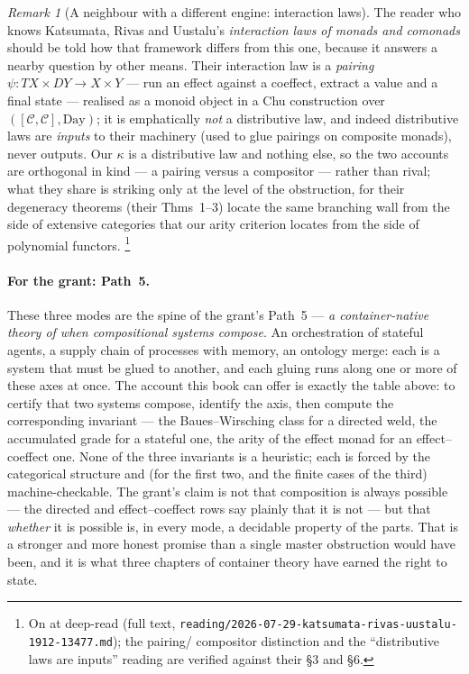 \documentclass[11pt,a4paper]{book}
\theoremstyle{plain}
\theoremstyle{definition}
\theoremstyle{remark}
\newtheorem{Remark}[Theorem]{Remark}
\begin{document}
\begin{Remark}[A neighbour with a different engine: interaction laws]\label{rem:kru}
The reader who knows Katsumata, Rivas and Uustalu's \emph{interaction laws of monads
and comonads} \cite{KRU20} should be told how that framework differs from this one,
because it answers a nearby question by other means. Their interaction law is a
\emph{pairing} $\psi\colon TX\times DY\to X\times Y$ --- run an effect against a
coeffect, extract a value and a final state --- realised as a monoid object in a Chu
construction over $([\mathcal C,\mathcal C],\text{Day})$; it is emphatically
\emph{not} a distributive law, and indeed distributive laws are \emph{inputs} to
their machinery (used to glue pairings on composite monads), never outputs. Our
$\kappa$ is a distributive law and nothing else, so the two accounts are orthogonal
in kind --- a pairing versus a compositor --- rather than rival; what they share is
striking only at the level of the obstruction, for their degeneracy theorems
(their Thms~1--3) locate the same branching wall from the side of extensive
categories that our arity criterion locates from the side of polynomial functors.%
\footnote{On \cite{KRU20} at deep-read (full text,
\texttt{reading/2026-07-29-katsumata-rivas-uustalu-1912-13477.md}); the pairing/
compositor distinction and the ``distributive laws are inputs'' reading are verified
against their \S3 and \S6.}
\end{Remark}

\paragraph{For the grant: Path~5.} These three modes are the spine of the grant's
Path~5 --- \emph{a container-native theory of when compositional systems compose}.
An orchestration of stateful agents, a supply chain of processes with memory, an
ontology merge: each is a system that must be glued to another, and each gluing runs
along one or more of these axes at once. The account this book can offer is exactly
the table above: to certify that two systems compose, identify the axis, then
compute the corresponding invariant --- the Baues--Wirsching class for a directed
weld, the accumulated grade for a stateful one, the arity of the effect monad for an
effect--coeffect one. None of the three invariants is a heuristic; each is forced by
the categorical structure and (for the first two, and the finite cases of the third)
machine-checkable. The grant's claim is not that composition is always possible ---
the directed and effect--coeffect rows say plainly that it is not --- but that
\emph{whether} it is possible is, in every mode, a decidable property of the parts.
That is a stronger and more honest promise than a single master obstruction would
have been, and it is what three chapters of container theory have earned the right
to state.
\end{document}

